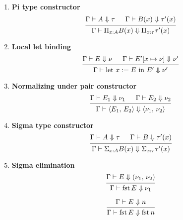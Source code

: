 \documentclass{article}
\begin{document}
\begin{enumerate}
\item \textbf{Pi type constructor} \\
  \[
    \begin{prooftree}
      \hypo{\Gamma \vdash A \Downarrow \tau}
      \hypo{\Gamma \vdash B(x) \Downarrow \tau'(x)}
      \infer2{\Gamma \vdash \Pi_{x : A} B(x) \Downarrow \Pi_{x : \tau} \tau'(x)}
    \end{prooftree}
  \]

\item \textbf{Local let binding} \\
    \[
      \begin{prooftree}
        \hypo{\Gamma \vdash E \Downarrow \nu}
        \hypo{\Gamma \vdash E'[x \mapsto \nu] \Downarrow \nu'}
        \infer2{\Gamma \vdash \text{let } x := E \text{ in } E' \Downarrow \nu'}
      \end{prooftree}
    \]

\item \textbf{Normalizing under pair constructor} \\
    \[
      \begin{prooftree}
        \hypo{\Gamma \vdash E_1 \Downarrow \nu_1}
        \hypo{\Gamma \vdash E_2 \Downarrow \nu_2}
        \infer2{\Gamma \vdash \langle E_1, \, E_2 \rangle \Downarrow \langle
          \nu_1, \, \nu_2 \rangle}
      \end{prooftree}
    \]

  \item \textbf{Sigma type constructor} \\
    \[
      \begin{prooftree}
        \hypo{\Gamma \vdash A \Downarrow \tau}
        \hypo{\Gamma \vdash B \Downarrow \tau'(x)}
        \infer2{\Gamma \vdash \Sigma_{x : A}B(x) \Downarrow \Sigma_{x : \tau}\tau'(x)}
      \end{prooftree}
    \]

  \item \textbf{Sigma elimination} \\
   \[
    \begin{prooftree}
      \hypo{\Gamma \vdash E \Downarrow (\nu_1, \, \nu_2)}
      \infer1{\Gamma \vdash \fst E \Downarrow \nu_1}
    \end{prooftree}
  \]

  \[
   \begin{prooftree}
    \hypo{\Gamma \vdash E \Downarrow n}
     \infer1{\Gamma \vdash \fst E \Downarrow \fst n}
   \end{prooftree}
  \]


\end{enumerate}
\end{document}
